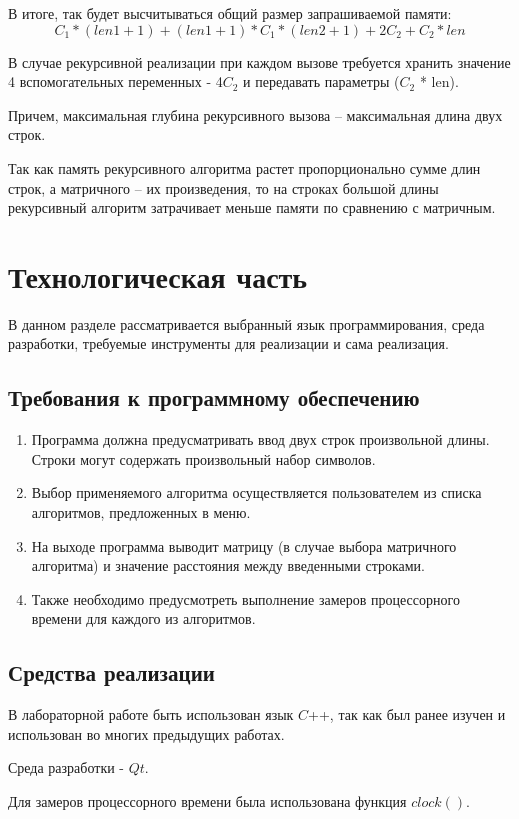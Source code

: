 \documentclass[12pt]{report}
\begin{document}
В итоге, так будет высчитываться общий размер запрашиваемой памяти:
$$C_1 * (len1 + 1) + (len1 + 1) * C_1 * (len2 + 1) + 2C_2 + C_2 * len $$

В случае рекурсивной реализации при каждом вызове требуется хранить значение 4 вспомогательных переменных - 4$C_2$ 
и передавать параметры ($C_2$ * len).

Причем, максимальная глубина рекурсивного вызова – максимальная длина двух строк.

Так как память рекурсивного алгоритма растет пропорционально сумме длин строк, а
матричного – их произведения, то на строках большой длины рекурсивный алгоритм затрачивает меньше памяти по сравнению с матричным.

\chapter{Технологическая часть}
В данном разделе рассматривается выбранный язык программирования, среда разработки, требуемые
инструменты для реализации и сама реализация.


\section{Требования к программному обеспечению}
\begin{enumerate}
	\item Программа должна предусматривать ввод двух строк произвольной длины. Строки
	могут содержать произвольный набор символов.
	\item Выбор применяемого алгоритма осуществляется пользователем из списка алгоритмов,
	предложенных в меню.
	\item На выходе программа выводит матрицу (в случае выбора матричного алгоритма) и
	значение расстояния между введенными строками.
	\item Также необходимо предусмотреть выполнение замеров процессорного времени для
	каждого из алгоритмов.

\end{enumerate}

\section{Средства реализации}
В лабораторной работе быть использован язык $C$++, так как был ранее изучен и использован во многих предыдущих работах.

Среда разработки - $Qt$.

Для замеров процессорного времени была использована функция $clock()$.
\newpage
\end{document}
